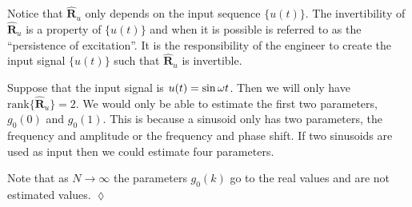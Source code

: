 Notice that $\hat{\mathbf{R}}_u$ only depends on the input sequence $\{u(t)\}$. The invertibility of $\hat{\mathbf{R}}_u$ is a property of $\{u(t)\}$ and when it is possible is referred to as the ``persistence of excitation''. It is the responsibility of the engineer to create the input signal $\{u(t)\}$ such that $\hat{\mathbf{R}}_u$ is invertible.

\begin{example}
Suppose that the input signal is $u(t)=\sin\omega t$. Then we will only have $\text{rank}\{\hat{\mathbf{R}}_u\}=2$. We would only be able to estimate the first two parameters, $g_0(0)$ and $g_0(1)$. This is because a sinusoid only has two parameters, the frequency and amplitude or the frequency and phase shift. If two sinusoids are used as input then we could estimate four parameters.

Note that as $N\to\infty$ the parameters $g_0(k)$ go to the real values and are not estimated values.
$\lozenge$
\end{example}

